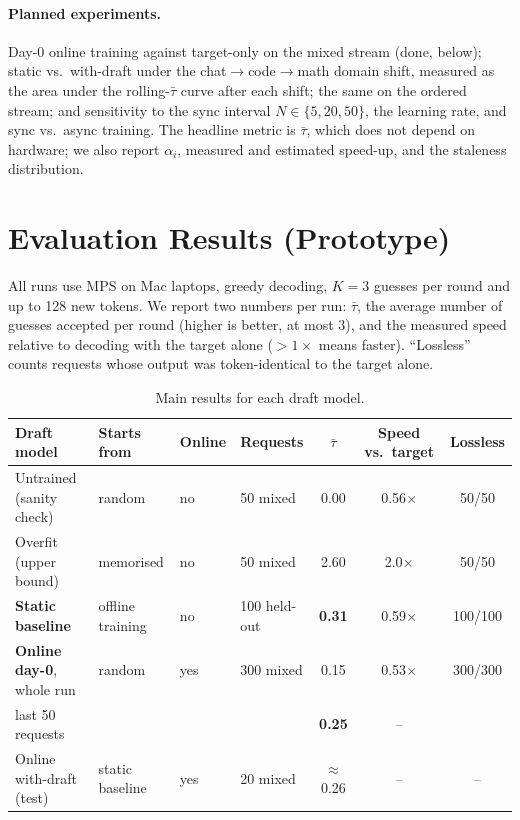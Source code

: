 \documentclass[11pt]{article}
\newcommand{\taubar}{\bar{\tau}}
\begin{document}
\paragraph{Planned experiments.} Day-0 online training against target-only on the mixed stream (done, below);
static vs.\ with-draft under the chat$\to$code$\to$math domain shift, measured as the area under the
rolling-$\taubar$ curve after each shift; the same on the ordered stream; and sensitivity to the sync interval
$N\in\{5,20,50\}$, the learning rate, and sync vs.\ async training. The headline metric is $\taubar$, which does not
depend on hardware; we also report $\alpha_i$, measured and estimated speed-up, and the staleness distribution.

\section{Evaluation Results (Prototype)}
\label{sec:results}

All runs use MPS on Mac laptops, greedy decoding, $K=3$ guesses per round and up to 128 new tokens. We report two
numbers per run: $\taubar$, the average number of guesses accepted per round (higher is better, at most 3), and
the measured speed relative to decoding with the target alone ($>1\times$ means faster). ``Lossless'' counts
requests whose output was token-identical to the target alone.

\begin{table}[t]
\centering\small
\caption{Main results for each draft model.}
\label{tab:main}
\footnotesize\setlength{\tabcolsep}{3.5pt}
\begin{tabular}{@{}llllccc@{}}
\toprule
Draft model & Starts from & Online & Requests & $\taubar$ & Speed vs.\ target & Lossless \\
\midrule
Untrained (sanity check) & random & no & 50 mixed & 0.00 & 0.56$\times$ & 50/50 \\
Overfit (upper bound) & memorised & no & 50 mixed & 2.60 & 2.0$\times$ & 50/50 \\
\midrule
\textbf{Static baseline} & offline training & no & 100 held-out & \textbf{0.31} & 0.59$\times$ & 100/100 \\
\textbf{Online day-0}, whole run & random & yes & 300 mixed & 0.15 & 0.53$\times$ & 300/300 \\
\quad last 50 requests & & & & \textbf{0.25} & -- & \\
Online with-draft (test) & static baseline & yes & 20 mixed & $\approx$0.26 & -- & -- \\
\bottomrule
\end{tabular}
\end{table}
\end{document}
